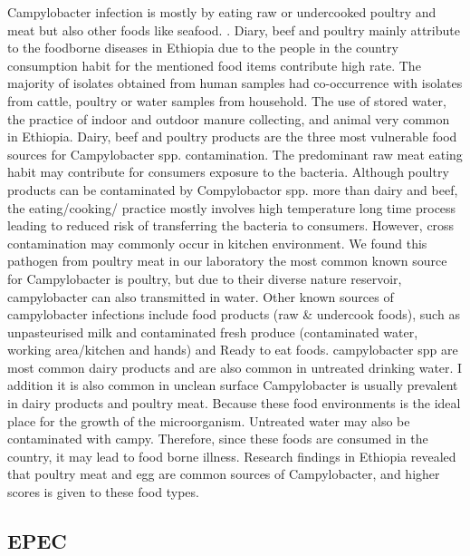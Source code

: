 \documentclass[
  letterpaper,
  DIV=11,
  numbers=noendperiod]{scrartcl}
\begin{document}
Campylobacter infection is mostly by eating raw or undercooked poultry
and meat but also other foods like seafood. . Diary, beef and poultry
mainly attribute to the foodborne diseases in Ethiopia due to the people
in the country consumption habit for the mentioned food items contribute
high rate. The majority of isolates obtained from human samples had
co-occurrence with isolates from cattle, poultry or water samples from
household. The use of stored water, the practice of indoor and outdoor
manure collecting, and animal very common in Ethiopia. Dairy, beef and
poultry products are the three most vulnerable food sources for
Campylobacter spp. contamination. The predominant raw meat eating habit
may contribute for consumers exposure to the bacteria. Although poultry
products can be contaminated by Compylobactor spp. more than dairy and
beef, the eating/cooking/ practice mostly involves high temperature long
time process leading to reduced risk of transferring the bacteria to
consumers. However, cross contamination may commonly occur in kitchen
environment. We found this pathogen from poultry meat in our laboratory
the most common known source for Campylobacter is poultry, but due to
their diverse nature reservoir, campylobacter can also transmitted in
water. Other known sources of campylobacter infections include food
products (raw \& undercook foods), such as unpasteurised milk and
contaminated fresh produce (contaminated water, working area/kitchen and
hands) and Ready to eat foods. campylobacter spp are most common dairy
products and are also common in untreated drinking water. I addition it
is also common in unclean surface Campylobacter is usually prevalent in
dairy products and poultry meat. Because these food environments is the
ideal place for the growth of the microorganism. Untreated water may
also be contaminated with campy. Therefore, since these foods are
consumed in the country, it may lead to food borne illness. Research
findings in Ethiopia revealed that poultry meat and egg are common
sources of Campylobacter, and higher scores is given to these food
types.

\subsection*{EPEC}\label{epec}
\end{document}
